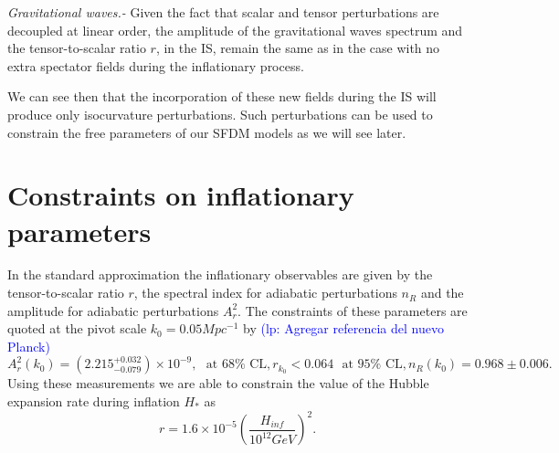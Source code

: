 \documentclass[amssymb,twocolumn,prd,nofootinbib,showpacs]{revtex4-1}
\newcommand{\lp}[1]{\textcolor{blue}{(lp: #1)}}
\begin{document}
\textit{Gravitational waves.-}
Given  the  fact  that  scalar  and tensor  perturbations  are  decoupled  at  linear  order,  
the amplitude  of the  gravitational  waves  spectrum and  the tensor-to-scalar ratio $r$, 
in the IS, remain the same as in the case with no extra spectator fields during the inflationary process.

We  can  see  then  that  the  incorporation  of  these  new fields during the IS will produce 
only isocurvature perturbations.  Such perturbations can be used to constrain the free 
parameters of our SFDM models as we will see later.
\section{Constraints on inflationary parameters}\label{experimentos}

In the standard approximation the inflationary observables are given by the tensor-to-scalar ratio $r$, 
the spectral index for adiabatic perturbations $n_R$ and the amplitude for adiabatic perturbations $A_r^2$.  
The constraints of these parameters are quoted at the pivot scale $k_0=0.05 Mpc^{-1}$ 
by \cite{const1,const2,planck,const3,const4,const5}\lp{Agregar referencia del nuevo Planck}
%
\begin{subequations}
\begin{equation}\label{amplitude}
A_r^2(k_0)=(2.215^{+0.032}_{-0.079})\times 10^{-9}, \ \ \ \text{at $68\%$ CL},
\end{equation}
\begin{equation}
r_{k_0}<0.064 \ \ \ \text{at $95\%$ CL},
\end{equation}
\begin{equation}\label{n_R}
n_R(k_0)=0.968 \pm 0.006.
\end{equation}
\end{subequations}
%
Using these measurements we are able to constrain the value of the Hubble expansion rate during 
inflation $H_*$ as \cite{H1,H2}
%
\begin{equation}\label{Hinf}
r = 1.6\times 10^{-5}\left(\frac{H_{inf}}{10^{12}GeV}\right)^2.
\end{equation}
\end{document}
